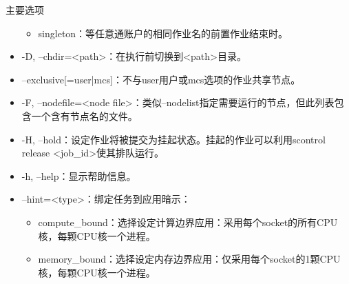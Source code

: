 \begin{frame}{主要选项}
\begin{itemize}
\begin{itemize}
    \item singleton：等任意通账户的相同作业名的前置作业结束时。
\end{itemize}
    \item -D, --chdir=<path>：在执行前切换到<path>目录。
    \item --exclusive[=user|mcs]：不与user用户或mcs选项的作业共享节点。
    \item -F, --nodefile=<node file>：类似--nodelist指定需要运行的节点，但此列表包含一个含有节点名的文件。
%
     \item -H, --hold：设定作业将被提交为挂起状态。挂起的作业可以利用scontrol release <job\_id>使其排队运行。
     \item -h, --help：显示帮助信息。
     \item --hint=<type>：绑定任务到应用暗示：
\begin{itemize}
	\item compute\_bound：选择设定计算边界应用：采用每个socket的所有CPU核，每颗CPU核一个进程。
    \item memory\_bound：选择设定内存边界应用：仅采用每个socket的1颗CPU核，每颗CPU核一个进程。

\end{itemize}
\end{itemize}
\end{frame}
